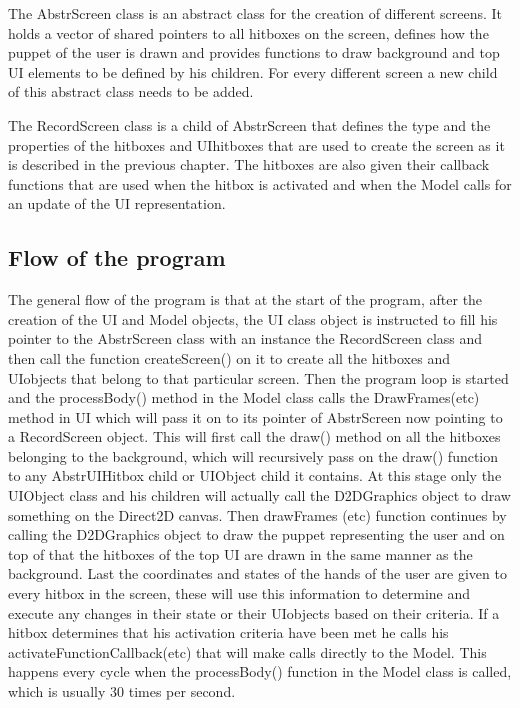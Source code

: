 The Abstr\textunderscore Screen class is an abstract class for the creation of different screens. It holds a vector of shared pointers to all hitboxes on the screen, defines how the puppet of the user is drawn and provides functions to draw background and top UI elements to be defined by his children. For every different screen a new child of this abstract class needs to be added.

The RecordScreen class is a child of Abstr\textunderscore Screen that defines the type and the properties of the hitboxes and UI\textunderscore hitboxes that are used to create the screen as it is described in the previous chapter. The hitboxes are also given their callback functions that are used when the hitbox is activated and when the Model calls for an update of the UI representation.

\subsection{Flow of the program}

The general flow of the program is that at the start of the program, after the creation of the UI and Model objects, the UI class object is instructed to fill his pointer to the Abstr\textunderscore Screen class with an instance the RecordScreen class and then call the function createScreen() on it to create all the hitboxes and UI\textunderscore objects that belong to that particular screen. Then the program loop is started and the processBody() method in the Model class calls the DrawFrames(etc) method in UI which will pass it on to its pointer of Abstr\textunderscore Screen now pointing to a RecordScreen object. This will first call the draw() method on all the hitboxes belonging to the background, which will recursively pass on the draw() function to any Abstr\textunderscore UI\textunderscore Hitbox child or UI\textunderscore Object child it contains. At this stage only the UI\textunderscore Object class and his children will actually call the D2D\textunderscore Graphics object to draw something on the Direct2D canvas. Then drawFrames (etc) function continues by calling the D2D\textunderscore Graphics object to draw the puppet representing the user and on top of that the hitboxes of the top UI are drawn in the same manner as the background. Last the coordinates and states of the hands of the user are given to every hitbox in the screen, these will use this information to determine and execute any changes in their state or their UI\textunderscore objects based on their criteria. If a hitbox determines that his activation criteria have been met he calls his activateFunctionCallback(etc) that will make calls directly to the Model. This happens every cycle when the processBody() function in the Model class is called, which is usually 30 times per second.

